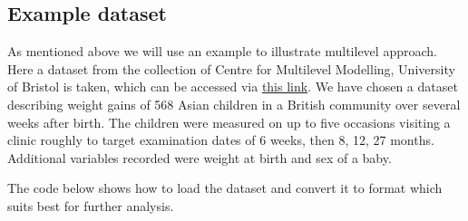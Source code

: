 \documentclass[
  12pt,
]{article}
\begin{document}
\subsection{Example dataset}

As mentioned above we will use an example to illustrate multilevel
approach. Here a dataset from the collection of Centre for Multilevel
Modelling, University of Bristol is taken, which can be accessed via
\href{https://www.bristol.ac.uk/cmm/learning/support/datasets/}{this
link}. We have chosen a dataset describing weight gains of 568 Asian
children in a British community over several weeks after birth. The
children were measured on up to five occasions visiting a clinic roughly
to target examination dates of 6 weeks, then 8, 12, 27 months.
Additional variables recorded were weight at birth and sex of a baby.

The code below shows how to load the dataset and convert it to format
which suits best for further analysis.
\end{document}
